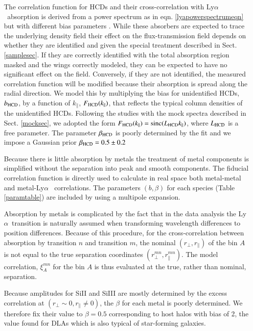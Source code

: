 \documentclass{aa}
\newcommand{\Lya}{Ly$\alpha$~}
\newcommand{\rperp}{r_\perp}
\newcommand{\rpar}{r_\parallel}
\newcommand{\betahcds}{\beta_{\rm HCD}}
\newcommand{\bhcds}{b_{\rm HCD}}
\newcommand{\Lhcds}{L_{\rm HCD}}
\begin{document}
The correlation function for HCDs and their cross-correlation
with \Lya absorption 
is derived from a power spectrum as in
eqn. \ref{lyapowerspectrumeqn}
but with different bias parameters \citep{2012JCAP...07..028F}.
While
these absorbers are  expected to trace the 
underlying density field
their effect on the flux-transmission field depends on whether 
they are identified and given the special treatment
described in Sect. \ref{samplesec}.
If they are correctly identified with the total absorption region masked
and the wings correctly modeled, they can be expected to have no
significant effect on the field.
Conversely, if they are not identified, the measured
correlation function will be modified because
their absorption is spread  along the radial direction.
We model this by multiplying the bias for
unidentified HCDs, $\bhcds$, by a function
of $k_\parallel$,
$F_{\rm HCD}(k_\parallel)$, that reflects the typical
column densities of the unidentified HCDs.
Following the studies with the mock spectra described in Sect. \ref{mocksec},
we adopted the
form $F_{\rm HCD}(k_\parallel)={\rm sinc}(\Lhcds k_\parallel)$,
where $\Lhcds$ is a free parameter.
The parameter $\betahcds$ is poorly determined by the fit
and we impose a Gaussian prior $\betahcds=0.5\pm 0.2$

Because there is little
absorption by metals
the treatment of metal components is simplified without
the separation into peak and smooth components.
The fiducial correlation function is directly used
to calculate in real space both metal-metal and metal-\Lya
correlations.  The parameters $(b,\beta)$ for each
species (Table \ref{paramtable})
are included by using a multipole expansion.

Absorption by metals is complicated
by the fact that in the data analysis
the \Lya transition is naturally assumed when transforming
wavelength differences to position differences.
Because of this procedure,
for the cross-correlation between absorption by transition $n$
and transition $m$,
the nominal $(\rperp,\rpar)$ of the bin $A$ is not equal to
the true separation coordinates $(\rperp^{mn},\rpar^{mn})$.
The model correlation, $\xi^{mn}_A$  for the bin $A$ is thus
evaluated at the true, rather than nominal, separation.

Because amplitudes for SiII and SiIII are mostly determined
by the excess correlation at $(\rperp\sim0, \rpar\neq0)$,
the $\beta$ for each metal is poorly determined.
We therefore fix their value to $\beta=0.5$
corresponding to host halos with bias of
2, the value found for DLAs \citep{2012JCAP...07..028F}
which is also typical
of star-forming galaxies.
\end{document}
